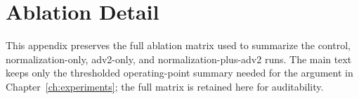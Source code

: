 \chapter{Ablation Detail}
\label{app:ablation_detail}

This appendix preserves the full ablation matrix used to summarize the control, normalization-only, adv2-only, and normalization-plus-adv2 runs. The main text keeps only the thresholded operating-point summary needed for the argument in Chapter~\ref{ch:experiments}; the full matrix is retained here for auditability.


